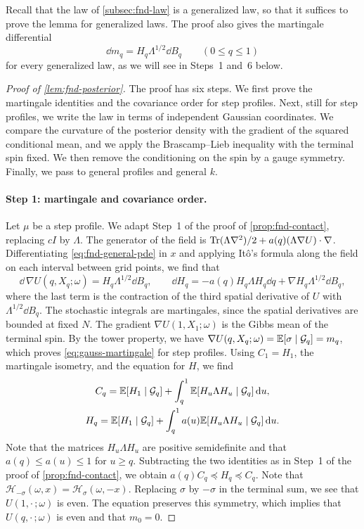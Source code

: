 Recall that the law of \cref{subsec:fnd-law} is a generalized law, so
that it suffices to prove the lemma for generalized laws. The proof also
gives the
martingale differential
\begin{equation}\label{eq:gauss-martingale}
 \dd m_q=H_q\Lambda^{1/2}\dd B_q\qquad(0\le q\le1)
\end{equation}
for every generalized law, as we will see in Steps~1 and~6 below.

\begin{proof}[Proof of \cref{lem:fnd-posterior}]
The proof has six steps. We first prove the martingale identities and
the covariance order for step profiles. Next, still for step profiles,
we write the law in terms of independent Gaussian coordinates. We
compare the curvature of the posterior density with the gradient of the
squared conditional mean, and we apply the Brascamp--Lieb inequality
with the terminal spin fixed. We then remove the conditioning on the
spin by a gauge symmetry. Finally, we pass to general profiles and
general $k$.

\paragraph{Step 1: martingale and covariance order.}
Let $\mu$ be a step profile. We adapt Step~1 of the proof of
\cref{prop:fnd-contact}, replacing $cI$ by $\Lambda$. The generator of
the field is
$\operatorname{Tr}(\Lambda\nabla^2)/2+a(q)(\Lambda\nabla U)\cdot\nabla$.
Differentiating \eqref{eq:fnd-general-pde} in $x$ and applying It\^o's
formula along the field on each interval between grid points, we find
that
\[
 \dd\,\nabla U(q,X_q;\omega)=H_q\Lambda^{1/2}\dd B_q,\qquad
 \dd H_q=-a(q)H_q\Lambda H_q\dd q+\nabla H_q\Lambda^{1/2}\dd B_q ,
\]
where the last term is the contraction of the third spatial derivative
of $U$ with $\Lambda^{1/2}\dd B_q$. The stochastic integrals are martingales,
since the spatial derivatives are bounded at fixed $N$. The
gradient $\nabla U(1,X_1;\omega)$ is the Gibbs mean of the terminal spin.
By the tower property, we have $\nabla U(q,X_q;\omega)=\mathbb E[\sigma\mid\mathcal G_q]=m_q$,
which proves \eqref{eq:gauss-martingale} for step profiles. Using
$C_1=H_1$, the martingale isometry, and the equation for $H$, we find
\[
 \begin{gathered}
 C_q=\mathbb E[H_1\mid\mathcal G_q]+\int_q^1\mathbb E[H_u\Lambda H_u\mid\mathcal G_q]\,\mathrm d u,
 \\
 H_q=\mathbb E[H_1\mid\mathcal G_q]+\int_q^1a(u)\mathbb E[H_u\Lambda H_u\mid\mathcal G_q]\,\mathrm d u .
 \end{gathered}
\]
Note that the matrices $H_u\Lambda H_u$ are positive semidefinite and
that $a(q)\le a(u)\le1$ for $u\ge q$. Subtracting the two identities as in
Step~1 of the proof of \cref{prop:fnd-contact}, we obtain
$a(q)C_q\preceq H_q\preceq C_q$. Note that
$\mathcal H_{-\sigma}(\omega,x)=\mathcal H_\sigma(\omega,-x)$. Replacing
$\sigma$ by $-\sigma$ in the terminal sum, we see that
$U(1,\cdot\,;\omega)$ is even. The equation preserves this symmetry,
which implies that $U(q,\cdot\,;\omega)$ is even and that $m_0=0$.


\end{proof}
